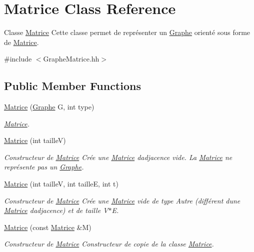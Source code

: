 \hypertarget{classMatrice}{}\section{Matrice Class Reference}
\label{classMatrice}


Classe \hyperlink{classMatrice}{Matrice} Cette classe permet de repr\'{e}senter un \hyperlink{classGraphe}{Graphe} orienté sous forme de \hyperlink{classMatrice}{Matrice}.  




{\ttfamily \#include $<$Graphe\+Matrice.\+hh$>$}

\subsection*{Public Member Functions}
\begin{DoxyCompactItemize}
\item 
\hyperlink{classMatrice_a08fcadca16c80a3b442a2960a7944732}{Matrice} (\hyperlink{classGraphe}{Graphe} G, int type)
\begin{DoxyCompactList}\small\item\em \hyperlink{classMatrice}{Matrice}. \end{DoxyCompactList}\item 
\hyperlink{classMatrice_a96e99274a8460529db8ee4076247c802}{Matrice} (int tailleV)
\begin{DoxyCompactList}\small\item\em Constructeur de \hyperlink{classMatrice}{Matrice} Cr\'{e}e une \hyperlink{classMatrice}{Matrice} d\textquotesingle{}adjacence vide. La \hyperlink{classMatrice}{Matrice} ne représente pas un \hyperlink{classGraphe}{Graphe}. \end{DoxyCompactList}\item 
\hyperlink{classMatrice_a30e71086a1d43bc3604188aaa6a3ac1c}{Matrice} (int tailleV, int tailleE, int t)
\begin{DoxyCompactList}\small\item\em Constructeur de \hyperlink{classMatrice}{Matrice} Cr\'{e}e une \hyperlink{classMatrice}{Matrice} vide de type Autre (diff\'{e}rent d\textquotesingle{}une \hyperlink{classMatrice}{Matrice} d\textquotesingle{}adjacence) et de taille V$\ast$E. \end{DoxyCompactList}\item 
\hyperlink{classMatrice_a39e4790e8f2a18263ba78c98fab4f0d2}{Matrice} (const \hyperlink{classMatrice}{Matrice} \&M)
\begin{DoxyCompactList}\small\item\em Constructeur de \hyperlink{classMatrice}{Matrice} Constructeur de copie de la classe \hyperlink{classMatrice}{Matrice}. \end{DoxyCompactList}\item 

\end{DoxyCompactItemize}
